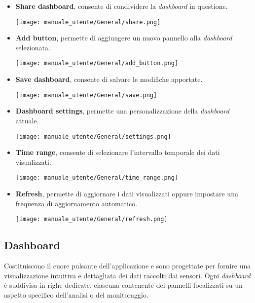 \begin{itemize}
\begin{center}
        \end{center}
    \item \textbf{Share dashboard}, consente di condividere la \textit{dashboard} in questione.
        \begin{center}
            \texttt{[image: manuale\_utente/General/share.png]}
        \end{center}
    \item \textbf{Add button}, permette di aggiungere un nuovo pannello alla \textit{dashboard} selezionata.
        \begin{center}
            \texttt{[image: manuale\_utente/General/add\_button.png]}
        \end{center}
    \item \textbf{Save dashboard}, consente di salvare le modifiche apportate.
        \begin{center}
            \texttt{[image: manuale\_utente/General/save.png]}
        \end{center}
    \newpage
    \item \textbf{Dashboard settings}, permette una personalizzazione della \textit{dashboard} attuale.
        \begin{center}
            \texttt{[image: manuale\_utente/General/settings.png]}
        \end{center}
    \item \textbf{Time range}, consente di selezionare l'intervallo temporale dei dati visualizzati.
        \begin{center}
            \texttt{[image: manuale\_utente/General/time\_range.png]}
        \end{center}
    \item \textbf{Refresh}, permette di aggiornare i dati visualizzati oppure impostare una frequenza di aggiornamento automatico.
        \begin{center}
            \texttt{[image: manuale\_utente/General/refresh.png]}
        \end{center}
\end{itemize}

\subsection{Dashboard}
Costituiscono il cuore pulsante dell'applicazione e sono progettate per fornire una visualizzazione intuitiva e dettagliata dei dati raccolti dai sensori. Ogni \textit{dashboard} è suddivisa in righe dedicate, ciascuna contenente dei pannelli focalizzati su un aspetto specifico dell'analisi o del monitoraggio.

